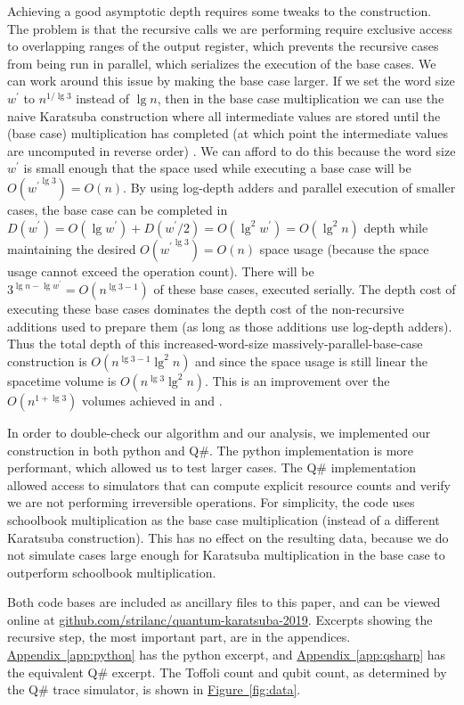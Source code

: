 \documentclass[onecolumn,unpublished]{quantumarticle}
\DeclareRobustCommand{\app}[1]{\hyperref[app:#1]{Appendix~\ref*{app:#1}}}
\newcommand{\fig}[1]{\hyperref[fig:#1]{Figure~\ref*{fig:#1}}}
\begin{document}
Achieving a good asymptotic depth requires some tweaks to the construction.
The problem is that the recursive calls we are performing require exclusive access to overlapping ranges of the output register, which prevents the recursive cases from being run in parallel, which serializes the execution of the base cases.
We can work around this issue by making the base case larger.
If we set the word size $w^\prime$ to $n^{1 / \lg 3}$ instead of $\lg n$, then in the base case multiplication we can use the naive Karatsuba construction where all intermediate values are stored until the (base case) multiplication has completed (at which point the intermediate values are uncomputed in reverse order) \cite{bennett1973logical}.
We can afford to do this because the word size $w^\prime$ is small enough that the space used while executing a base case will be $O({w^\prime}^{\lg 3}) = O(n)$.
By using log-depth adders and parallel execution of smaller cases, the base case can be completed in $D(w^\prime) = O(\lg w^\prime) + D(w^\prime/2) = O(\lg^2 w^\prime) = O(\lg^2 n)$ depth while maintaining the desired $O({w^\prime}^{\lg 3}) = O(n)$ space usage (because the space usage cannot exceed the operation count).
There will be $3^{\lg n - \lg w^\prime} = O(n^{\lg 3 - 1})$ of these base cases, executed serially.
The depth cost of executing these base cases dominates the depth cost of the non-recursive additions used to prepare them (as long as those additions use log-depth adders).
Thus the total depth of this increased-word-size massively-parallel-base-case construction is $O(n^{\lg 3 - 1} \lg^2 n)$ and since the space usage is still linear the spacetime volume is $O(n^{\lg 3} \lg^2 n)$.
This is an improvement over the $O(n^{1 + \lg 3})$ volumes achieved in \cite{portugal2006karatsuba} and \cite{parent2017karatsuba}.

In order to double-check our algorithm and our analysis, we implemented our construction in both python and Q\#.
The python implementation is more performant, which allowed us to test larger cases.
The Q\# implementation allowed access to simulators that can compute explicit resource counts and verify we are not performing irreversible operations.
For simplicity, the code uses schoolbook multiplication as the base case multiplication (instead of a different Karatsuba construction).
This has no effect on the resulting data, because we do not simulate cases large enough for Karatsuba multiplication in the base case to outperform schoolbook multiplication.

Both code bases are included as ancillary files to this paper, and can be viewed online at \href{https://github.com/strilanc/quantum-karatsuba-2019}{github.com/strilanc/quantum-karatsuba-2019}.
Excerpts showing the recursive step, the most important part, are in the appendices.
\app{python} has the python excerpt, and \app{qsharp} has the equivalent Q\# excerpt.
The Toffoli count and qubit count, as determined by the Q\# trace simulator, is shown in \fig{data}.
\end{document}
